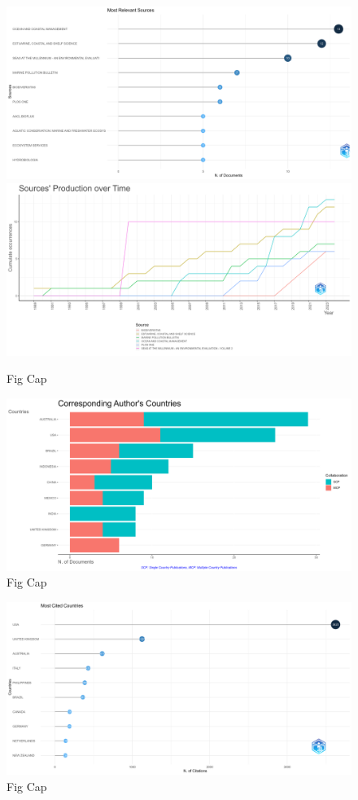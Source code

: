 \documentclass[
  12pt,
]{article}
\begin{document}
\begin{figure}
\includegraphics[width=0.5\linewidth]{MostRelevantSources} \includegraphics[width=0.5\linewidth]{SourceDynamics} \caption{Fig Cap \label{SourceDynamics}}\label{fig:SourceDynamics}
\end{figure}



\begin{figure}
\includegraphics[width=1\linewidth]{AuthorCountries} \caption{Fig Cap \label{AuthorCountries}}\label{fig:AuthorCountries}
\end{figure}



\begin{figure}
\includegraphics[width=1\linewidth]{MostCitedCountries} \caption{Fig Cap \label{MostCitedCountries}}\label{fig:MostCitedCountries}
\end{figure}
\end{document}
